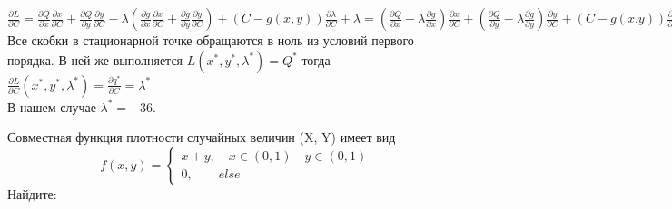 \documentclass[addpoints, answers]{exam} %
\begin{document}
\begin{questions}
\begin{solution}
$\frac{\partial L}{\partial C}=\frac{\partial Q }{\partial x}\frac{\partial x}{\partial C}+\frac{\partial Q}{\partial y}\frac{\partial y}{\partial C}-\lambda(\frac{\partial g}{\partial x}\frac{\partial x }{\partial C}+\frac{\partial g}{\partial y}\frac{\partial y}{\partial C })+(C-g(x,y))\frac{\partial \lambda}{\partial C}+\lambda= (\frac{\partial Q}{\partial x}-\lambda \frac{\partial g}{\partial x})\frac{\partial x}{\partial C}+(\frac{\partial Q}{\partial y}-\lambda \frac{\partial g}{\partial y})\frac{\partial y}{\partial C}+(C-g(x.y))\frac{\partial \lambda}{\partial C}+\lambda$
Все скобки в стационарной точке обращаются в ноль из условий первого порядка. В ней же выполняется $L(x^*,y^*,\lambda^*)=Q^*$ тогда $\frac{\partial L}{\partial C}(x^*,y^*,\lambda^*)=\frac{\partial q^*}{\partial C}=\lambda^*$\\
В нашем случае $\lambda^*=-36$.

\end{solution}

\question	Совместная функция плотности случайных величин (X, Y) имеет вид
\[
f(x,y)=
\begin{cases}
x+y, \quad x \in (0,1) \quad y \in (0,1)\\
0, \quad \quad else
\end{cases}
\]
Найдите:
\end{questions}
\end{document}
